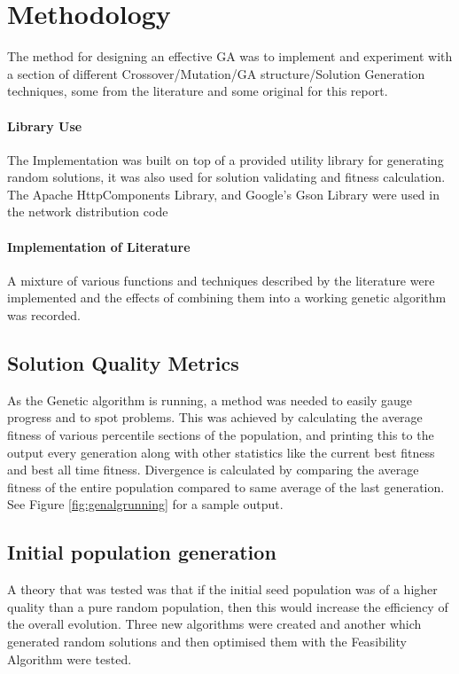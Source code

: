 \documentclass[14pt]{acmsiggraph}
\begin{document}
	\section{Methodology}
	The method for designing an effective GA was to implement and experiment with a section of different Crossover/Mutation/GA structure/Solution Generation techniques, some from the literature and some original for this report.
	
	\paragraph{Library Use}
	The Implementation was built on top of a provided utility library for generating random solutions, it was also used for solution validating and fitness calculation.\\
	The Apache HttpComponents Library, and Google's Gson Library were used in the network distribution code
	
	\paragraph{Implementation of Literature}
	A mixture of various functions and techniques described by the literature were implemented and the effects of combining them into a working genetic algorithm was recorded.
	
	\subsection{Solution Quality Metrics}
	As the Genetic algorithm is running, a method was needed to easily gauge progress and to spot problems. This was achieved by calculating the average fitness of various percentile sections of the population, and printing this to the output every generation along with other statistics like the current best fitness and  best all time fitness.  Divergence is calculated by comparing the average fitness of the entire population compared to same average of the last generation.
	See Figure \ref{fig:genalgrunning} for a sample output.
	
	\subsection{Initial population generation}
	A theory that was tested was that if the initial seed population was of a higher quality than a pure random population, then this would increase the efficiency of the overall evolution. Three new algorithms were created and another which generated random solutions and then optimised them with the Feasibility Algorithm were tested.
	
\end{document}
